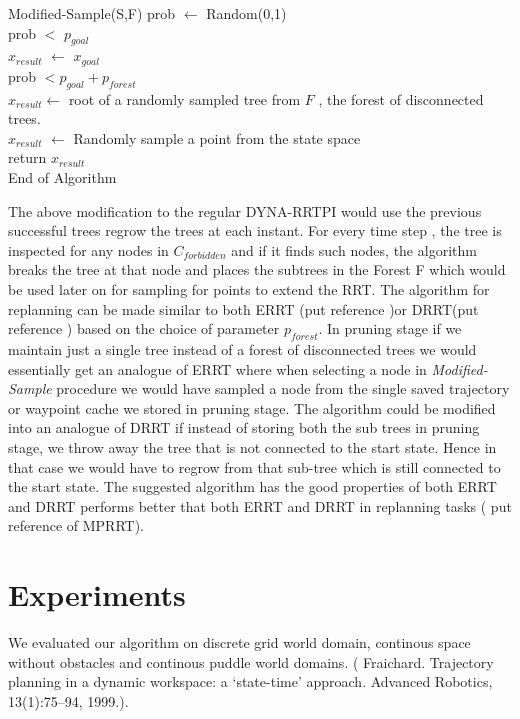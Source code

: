 \documentclass[MTech]{iitmdiss}
\begin{document}
\begin{algorithm}{Modified-Sample(S,F)}{
\label{algo: Modified-Sample}
}
prob $\leftarrow$ Random(0,1)\\
\qif prob $<$ $p_{goal}$\\
\qthen $x_{result}$ $\leftarrow$ $x_{goal}$\\
\qelse \qif prob $< p_{goal} + p_{forest}$\\
\qthen $x_{result} \leftarrow$ root of a randomly sampled tree from $F$ , the forest of disconnected trees.\\
\qelse $x_{result}$ $\leftarrow$ Randomly sample a point from the state space \qfi\qfi\\
return $x_{result}$\\
End of Algorithm
\end{algorithm}

The above modification to the regular DYNA-RRTPI would use the previous successful trees regrow the trees at each instant. For every time step , the tree is inspected for any nodes in $C_{forbidden}$ and if it finds such nodes, the algorithm breaks the tree at that node and places the subtrees in the Forest F which would be used later on for sampling for points to extend the RRT. The algorithm for replanning can be made similar to both ERRT (put reference )or DRRT(put reference ) based on the choice of parameter $p_{forest}$. In pruning stage if we maintain just a single tree instead of a forest of disconnected trees we would essentially get an analogue of ERRT where when selecting a node in \textit{Modified-Sample} procedure we would have sampled a node from the single saved trajectory or waypoint cache we stored in pruning stage. The algorithm could be modified into an analogue of DRRT if instead of storing both the sub trees in pruning stage, we throw away the tree that is not connected to the start state. Hence in that case we would have to regrow from that sub-tree which is still connected to the start state. The suggested algorithm has the good properties of both ERRT and DRRT performs better that both ERRT and DRRT in replanning tasks ( put reference of MPRRT).

\section{Experiments}

We evaluated our algorithm on discrete grid world domain, continous space without obstacles and continous puddle world domains.
 (  Fraichard. Trajectory planning in a dynamic workspace: a ‘state-time’ approach. Advanced Robotics, 13(1):75–94, 1999.). 
\end{document}
